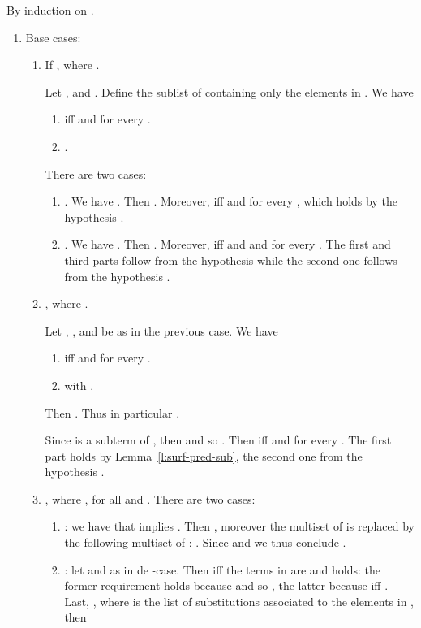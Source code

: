 \documentclass{LMCS}
\renewcommand{\>}{\rightarrow}
\begin{document}
\proof
By induction on .
\begin{enumerate}[]
\item Base cases:
\begin{enumerate}[]
  \item If , where . 

Let ,
 and
. Define   the sublist of  containing only the elements in .  We have
\begin{enumerate}[]
  \item  iff  and
     for every .
  \item .
\end{enumerate}
There are two cases:
\begin{enumerate}[(1)]
  \item \emph{}. We have
    . Then
    . Moreover,
     iff  and 
    for every  , which holds by 
    the hypothesis .
\item \emph{}. We have
  .  Then .  Moreover, 
  iff  and  and  for every . The first and third parts follow
from the hypothesis  while the second one follows from the hypothesis
  .
\end{enumerate}

  \item , where .  

Let , ,  and  be as in the previous case.
We have 
\begin{enumerate}[]
  \item  iff  and
     for every .
  \item  with .
\end{enumerate}

Then 
    . Thus in particular .

 Since  is a
    subterm of , then   and so
    . Then  iff  and  for every . The first part  holds by  Lemma~\ref{l:surf-pred-sub}, the second one from the
hypothesis . 

\item , where 
  ,  for all  and . There are two cases:
  \begin{enumerate}[(1)]
  \item \emph{}: we have that  implies
    . Then , moreover the multiset
     of
 is replaced by the following multiset of
        : 
      .  Since  and  we thus
        conclude .

\item \emph{}: let  and 
   as in de -case. Then   iff
  the terms in  are  and 
  holds: the former requirement holds because
   and so , the
  latter because   iff 
  . Last, ,
  where  is the list of substitutions associated to the elements
  in , then 



\end{enumerate}
\end{enumerate}
\end{enumerate}
\end{document}
